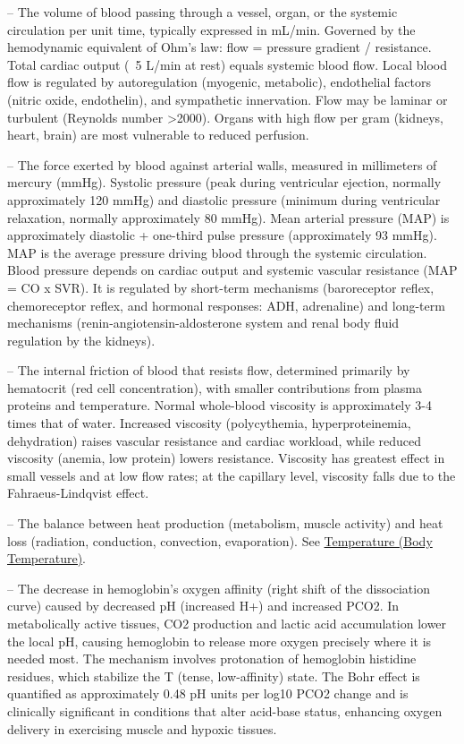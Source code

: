 -- The volume of blood passing through a vessel, organ, or the systemic circulation per unit time, typically expressed in mL/min. Governed by the hemodynamic equivalent of Ohm's law: flow = pressure gradient / resistance. Total cardiac output (~5 L/min at rest) equals systemic blood flow. Local blood flow is regulated by autoregulation (myogenic, metabolic), endothelial factors (nitric oxide, endothelin), and sympathetic innervation. Flow may be laminar or turbulent (Reynolds number >2000). Organs with high flow per gram (kidneys, heart, brain) are most vulnerable to reduced perfusion.

-- The force exerted by blood against arterial walls, measured in millimeters of mercury (mmHg). Systolic pressure (peak during ventricular ejection, normally approximately 120 mmHg) and diastolic pressure (minimum during ventricular relaxation, normally approximately 80 mmHg). Mean arterial pressure (MAP) is approximately diastolic + one-third pulse pressure (approximately 93 mmHg). MAP is the average pressure driving blood through the systemic circulation. Blood pressure depends on cardiac output and systemic vascular resistance (MAP = CO x SVR). It is regulated by short-term mechanisms (baroreceptor reflex, chemoreceptor reflex, and hormonal responses: ADH, adrenaline) and long-term mechanisms (renin-angiotensin-aldosterone system and renal body fluid regulation by the kidneys).

-- The internal friction of blood that resists flow, determined primarily by hematocrit (red cell concentration), with smaller contributions from plasma proteins and temperature. Normal whole-blood viscosity is approximately 3-4 times that of water. Increased viscosity (polycythemia, hyperproteinemia, dehydration) raises vascular resistance and cardiac workload, while reduced viscosity (anemia, low protein) lowers resistance. Viscosity has greatest effect in small vessels and at low flow rates; at the capillary level, viscosity falls due to the Fahraeus-Lindqvist effect.

-- The balance between heat production (metabolism, muscle activity) and heat loss (radiation, conduction, convection, evaporation). See \hyperlink{Temperature (Body Temperature)}{Temperature (Body Temperature)}.

-- The decrease in hemoglobin's oxygen affinity (right shift of the dissociation curve) caused by decreased pH (increased H+) and increased PCO2. In metabolically active tissues, CO2 production and lactic acid accumulation lower the local pH, causing hemoglobin to release more oxygen precisely where it is needed most. The mechanism involves protonation of hemoglobin histidine residues, which stabilize the T (tense, low-affinity) state. The Bohr effect is quantified as approximately 0.48 pH units per log10 PCO2 change and is clinically significant in conditions that alter acid-base status, enhancing oxygen delivery in exercising muscle and hypoxic tissues.

